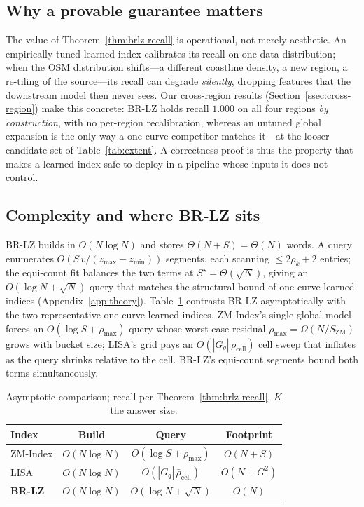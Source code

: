 \subsection{Why a provable guarantee matters}\label{ssec:why}
The value of Theorem~\ref{thm:brlz-recall} is operational, not merely
aesthetic. An empirically tuned learned index calibrates its recall on one
data distribution; when the OSM distribution shifts---a different coastline
density, a new region, a re-tiling of the source---its recall can degrade
\emph{silently}, dropping features that the downstream model then never
sees. Our cross-region results (Section~\ref{ssec:cross-region}) make this
concrete: BR-LZ holds recall $1.000$ on all four regions \emph{by
construction}, with no per-region recalibration, whereas an untuned global
expansion is the only way a one-curve competitor matches it---at the looser
candidate set of Table~\ref{tab:extent}. A correctness proof is thus the
property that makes a learned index safe to deploy in a pipeline whose
inputs it does not control.

\subsection{Complexity and where BR-LZ sits}\label{ssec:pareto}
BR-LZ builds in $O(N\log N)$ and stores $\Theta(N+S)=\Theta(N)$ words. A
query enumerates $O(S\,v/(z_{\max}\!-\!z_{\min}))$ segments, each scanning
$\le 2\rho_k+2$ entries; the equi-count fit balances the two terms at
$S^\star\!=\!\Theta(\sqrt N)$, giving an $O(\log N+\sqrt N)$ query that
matches the structural bound of one-curve learned indices
(Appendix~\ref{app:theory}). 
Table~\ref{tab:pareto-asym} contrasts BR-LZ asymptotically with the two
representative one-curve learned indices. ZM-Index's single global model
forces an $O(\log S+\rho_{\max})$ query whose worst-case residual
$\rho_{\max}=\Omega(N/S_{\mathrm{ZM}})$ grows with bucket size; LISA's
grid pays an $O(|G_q|\,\bar\rho_{\mathrm{cell}})$ cell sweep that inflates
as the query shrinks relative to the cell. BR-LZ's equi-count segments
bound both terms simultaneously.

\begin{table}[t]
\centering
\caption{Asymptotic comparison; recall per
Theorem~\ref{thm:brlz-recall}, $K$ the answer size.}\label{tab:pareto-asym}
\small
\setlength{\tabcolsep}{3pt}
\begin{tabular}{lccc}
\toprule
Index & Build & Query & Footprint \\
\midrule
ZM-Index   & $O(N\log N)$ & $O(\log S+\rho_{\max})$ & $O(N+S)$ \\
LISA       & $O(N\log N)$ & $O(|G_q|\,\bar\rho_{\mathrm{cell}})$ & $O(N+G^2)$ \\
\textbf{BR-LZ} & $O(N\log N)$ & $O(\log N+\sqrt N)$ & $O(N)$ \\
\bottomrule
\end{tabular}
\setlength{\tabcolsep}{6pt}
\end{table}

